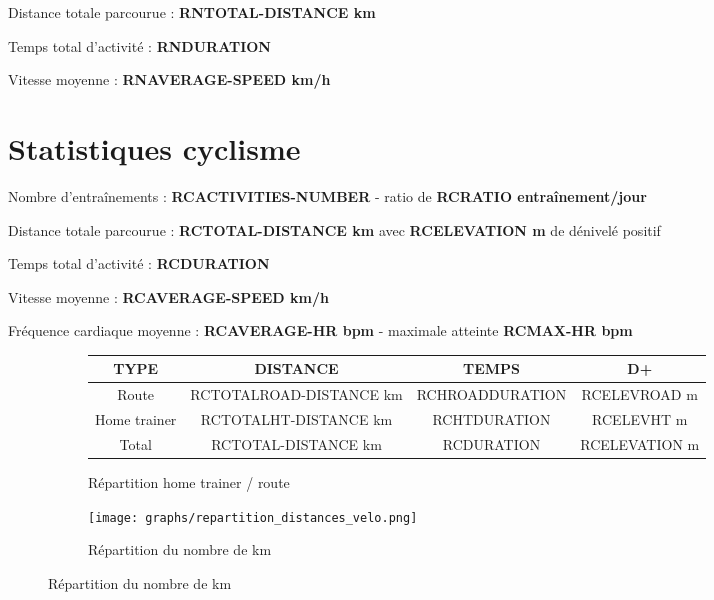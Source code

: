\documentclass[a4paper,french,11pt]{report}
\begin{document}
\textbullet Distance totale parcourue : \textbf{RNTOTAL-DISTANCE km}

\textbullet Temps total d'activité : \textbf{RNDURATION}

\textbullet Vitesse moyenne : \textbf{RNAVERAGE-SPEED km/h}


\section*{Statistiques cyclisme}
\thispagestyle{empty}

\textbullet Nombre d'entraînements : \textbf{RCACTIVITIES-NUMBER} - ratio de \textbf{RCRATIO entraînement/jour}

\textbullet Distance totale parcourue : \textbf{RCTOTAL-DISTANCE km} avec \textbf{RCELEVATION m} de dénivelé positif

\textbullet Temps total d'activité : \textbf{RCDURATION}

\textbullet Vitesse moyenne : \textbf{RCAVERAGE-SPEED km/h}

\textbullet Fréquence cardiaque moyenne : \textbf{RCAVERAGE-HR bpm} - maximale atteinte \textbf{RCMAX-HR bpm}

\begin{figure}[!ht]
	\begin{subfigure}{.49\linewidth}
	
	\centering
	
	\begin{tabular}{|c|c|c|c|}
		\hline
		\textbf{TYPE}         & \textbf{DISTANCE}                & \textbf{TEMPS}           & \textbf{D+}           \\ \hline
		Route        & RCTOTALROAD-DISTANCE km & RCHROADDURATION & RCELEVROAD m  \\ \hline
		Home trainer & RCTOTALHT-DISTANCE km   & RCHTDURATION    & RCELEVHT m    \\ \hline
		Total        & RCTOTAL-DISTANCE km     & RCDURATION      & RCELEVATION m \\ \hline
		\end{tabular}
		\caption*{Répartition home trainer / route}

	\end{subfigure}\hfill
	\begin{subfigure}{.49\linewidth}
	
	\centering
	
	\texttt{[image: graphs/repartition\_distances\_velo.png]}
	\caption*{Répartition du nombre de km}
	
	\end{subfigure}
	
	\end{figure}
	
\end{document}
